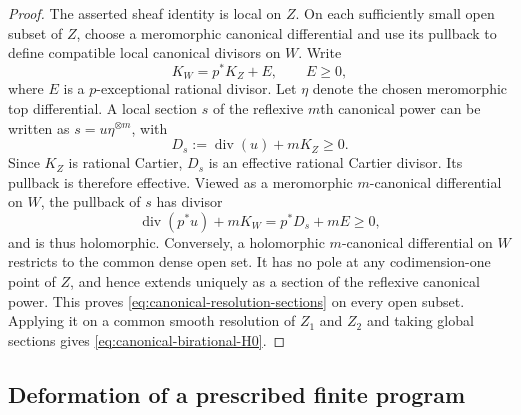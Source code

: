 \documentclass[11pt,a4paper]{article}
\theoremstyle{definition}\newtheorem{definition}[theorem]{Definition}
\theoremstyle{remark}\newtheorem*{remark}{Remark}
\begin{document}
\begin{proof}
The asserted sheaf identity is local on $Z$. On each sufficiently small
open subset of $Z$, choose a meromorphic canonical differential and use
its pullback to define compatible local canonical divisors on $W$.
Write
\[
 K_W=p^*K_Z+E,\qquad E\ge0,
\]
where $E$ is a $p$-exceptional rational divisor. Let $\eta$ denote the
chosen meromorphic top differential. A local section $s$ of the
reflexive $m$th canonical power can be written as
$s=u\eta^{\otimes m}$, with
\[
 D_s:=\operatorname{div}(u)+mK_Z\ge0.
\]
Since $K_Z$ is rational Cartier, $D_s$ is an effective rational Cartier
divisor. Its pullback is therefore effective. Viewed as a meromorphic
$m$-canonical differential on $W$, the pullback of $s$ has divisor
\[
 \operatorname{div}(p^*u)+mK_W=p^*D_s+mE\ge0,
\]
and is thus holomorphic. Conversely, a holomorphic $m$-canonical
differential on $W$ restricts to the common dense open set. It has no
pole at any codimension-one point of $Z$, and hence extends uniquely
as a section of the reflexive canonical power. This proves
\eqref{eq:canonical-resolution-sections} on every open subset.
Applying it on a common smooth resolution of $Z_1$ and $Z_2$ and taking
global sections gives \eqref{eq:canonical-birational-H0}.
\end{proof}

\subsection{Deformation of a prescribed finite program}
\end{document}
